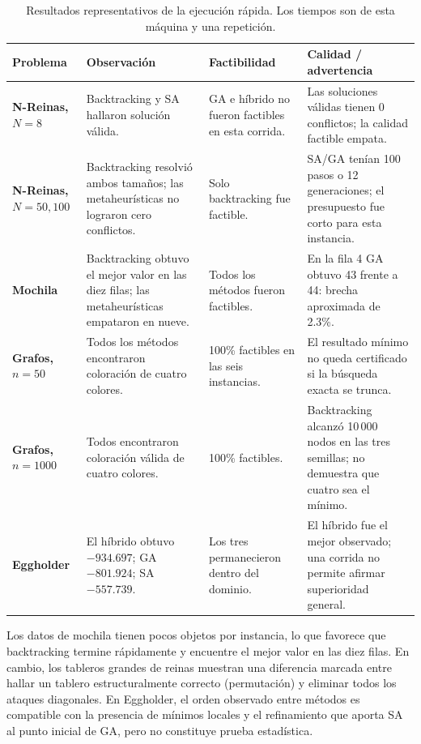 \documentclass[12pt,letterpaper]{article}
\begin{document}
\begin{table}[H]
  \centering
  \caption{Resultados representativos de la ejecución rápida. Los tiempos son de esta máquina y una repetición.}
  \small
  \begin{tabularx}{\textwidth}{>{\bfseries}p{2.5cm} X p{2.7cm} p{2.3cm}}
    \toprule
    Problema & Observación & Factibilidad & Calidad / advertencia \\
    \midrule
    N-Reinas, $N=8$ & Backtracking y SA hallaron solución válida. & GA e híbrido no fueron factibles en esta corrida. & Las soluciones válidas tienen 0 conflictos; la calidad factible empata. \\
    N-Reinas, $N=50,100$ & Backtracking resolvió ambos tamaños; las metaheurísticas no lograron cero conflictos. & Solo backtracking fue factible. & SA/GA tenían 100 pasos o 12 generaciones; el presupuesto fue corto para esta instancia. \\
    Mochila & Backtracking obtuvo el mejor valor en las diez filas; las metaheurísticas empataron en nueve. & Todos los métodos fueron factibles. & En la fila 4 GA obtuvo 43 frente a 44: brecha aproximada de 2.3\%. \\
    Grafos, $n=50$ & Todos los métodos encontraron coloración de cuatro colores. & 100\% factibles en las seis instancias. & El resultado mínimo no queda certificado si la búsqueda exacta se trunca. \\
    Grafos, $n=1000$ & Todos encontraron coloración válida de cuatro colores. & 100\% factibles. & Backtracking alcanzó 10\,000 nodos en las tres semillas; no demuestra que cuatro sea el mínimo. \\
    Eggholder & El híbrido obtuvo $-934.697$; GA $-801.924$; SA $-557.739$. & Los tres permanecieron dentro del dominio. & El híbrido fue el mejor observado; una corrida no permite afirmar superioridad general. \\
    \bottomrule
  \end{tabularx}
\end{table}

Los datos de mochila tienen pocos objetos por instancia, lo que favorece que
backtracking termine rápidamente y encuentre el mejor valor en las diez filas.
En cambio, los tableros grandes de reinas muestran una diferencia marcada
entre hallar un tablero estructuralmente correcto (permutación) y eliminar
todos los ataques diagonales. En Eggholder, el orden observado entre métodos
es compatible con la presencia de mínimos locales y el refinamiento que aporta
SA al punto inicial de GA, pero no constituye prueba estadística.
\end{document}
